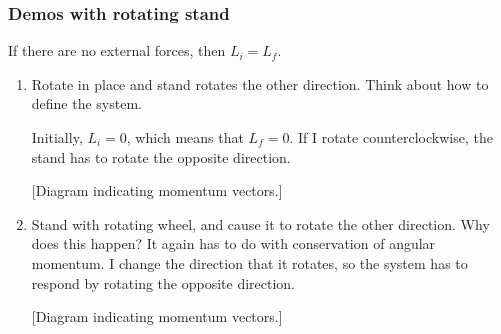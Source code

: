 \subsubsection*{Demos with rotating stand}
If there are no external forces, then $L_i=L_f$.
\begin{enumerate}
\item Rotate in place and stand rotates the other direction. Think about how to define the system.

Initially, $L_i=0$, which means that $L_f=0$. If I rotate counterclockwise, the stand has to rotate the opposite direction.


[Diagram indicating momentum vectors.]\nopagebreak
\vspace{5cm}

\item Stand with rotating wheel, and cause it to rotate the other direction. Why does this happen? It again has to do with conservation of angular momentum. I change the direction that it rotates, so the system has to respond by rotating the opposite direction.

[Diagram indicating momentum vectors.]\nopagebreak
\vspace{5cm}





\end{enumerate}
\clearpage
